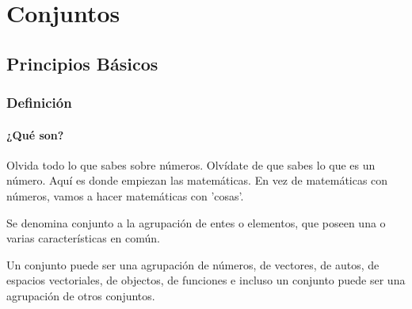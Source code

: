 \documentclass[12pt, fleqn]{report}                             %
\theoremstyle{break}                                            %
\begin{document}
\part{Conjuntos}

    \chapter{Principios Básicos}
        \clearpage

        \section{Definición}

            \subsection{¿Qué son?}
                Olvida todo lo que sabes sobre números. Olvídate de que sabes lo que es un número.
                Aquí es donde empiezan las matemáticas. En vez de matemáticas con números,
                vamos a hacer matemáticas con 'cosas'.

                Se denomina conjunto a la agrupación de entes o elementos, que poseen una o
                varias características en común. 

                Un conjunto puede ser una agrupación de números, de vectores, de autos, de espacios vectoriales,
                de objectos, de funciones e incluso un conjunto puede ser una agrupación de otros conjuntos.
\end{document}
